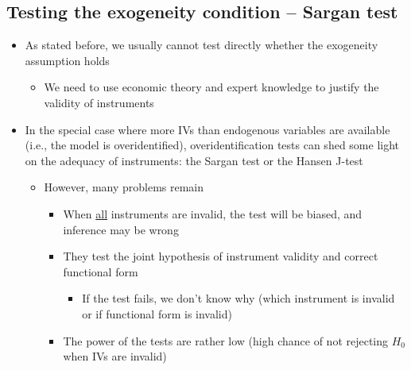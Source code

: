 \documentclass[10pt]{article}
\begin{document}
\subsection{Testing the exogeneity condition -- Sargan test}
\begin{itemize}
    \item As stated before, we usually cannot test directly whether the exogeneity assumption holds 
    \begin{itemize}
        \item We need to use economic theory and expert knowledge to justify the validity of instruments 
    \end{itemize}
    \item In the special case where more IVs than endogenous variables are available (i.e., the model is overidentified), overidentification tests can shed some light on the adequacy of instruments: the Sargan test or the Hansen J-test 
    \begin{itemize}
        \item However, many problems remain 
        \begin{itemize}
            \item When \underline{all} instruments are invalid, the test will be biased, and inference may be wrong 
            \item They test the joint hypothesis of instrument validity and correct functional form 
            \begin{itemize}
                \item If the test fails, we don't know why (which instrument is invalid or if functional form is invalid)
            \end{itemize}
            \item The power of the tests are rather low (high chance of not rejecting $H_0 $ when IVs are invalid)
        \end{itemize}
    \end{itemize}
\end{itemize}
\newpage 
\end{document}
